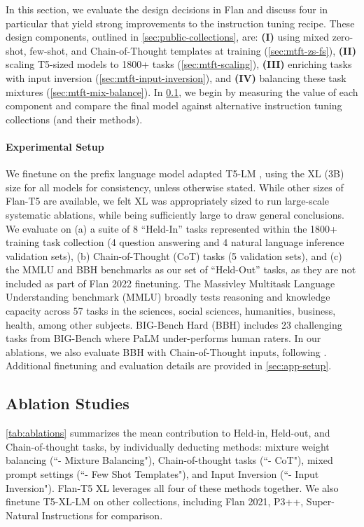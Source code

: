 In this section, we evaluate the design decisions in Flan and discuss four in particular that yield strong improvements to the instruction tuning recipe. These design components, outlined in \ref{sec:public-collections}, are: \textbf{(I)} using mixed zero-shot, few-shot, and Chain-of-Thought templates at training (\ref{sec:mtft-zs-fs}), \textbf{(II)} scaling T5-sized models to 1800+ tasks (\ref{sec:mtft-scaling}), \textbf{(III)} enriching tasks with input inversion (\ref{sec:mtft-input-inversion}), and \textbf{(IV)} balancing these task mixtures (\ref{sec:mtft-mix-balance}).
In \ref{sec:ablations}, we begin by measuring the value of each component and compare the final model against alternative instruction tuning collections (and their methods).

\paragraph{Experimental Setup} We finetune on the prefix language model adapted T5-LM \citep{lester-etal-2021-power}, using the XL (3B) size for all models for consistency, unless otherwise stated. While other sizes of Flan-T5 are available, we felt XL was appropriately sized to run large-scale systematic ablations, while being sufficiently large to draw general conclusions. We evaluate on (a) a suite of 8 ``Held-In'' tasks represented within the 1800+ training task collection (4 question answering and 4 natural language inference validation sets), (b) Chain-of-Thought (CoT) tasks (5 validation sets), and (c) the MMLU \citep{hendrycks2020measuring} and BBH \citep{suzgun2022challenging} benchmarks as our set of ``Held-Out'' tasks, as they are not included as part of Flan 2022 finetuning. The Massivley Multitask Language Understanding benchmark (MMLU) broadly tests reasoning and knowledge capacity across 57 tasks in the sciences, social sciences, humanities, business, health, among other subjects. BIG-Bench Hard (BBH) includes 23 challenging tasks from BIG-Bench \citep{bigbench} where PaLM under-performs human raters. In our ablations, we also evaluate BBH with Chain-of-Thought inputs, following \citet{chung2022scaling}.
Additional finetuning and evaluation details are provided in \ref{sec:app-setup}.

\subsection{Ablation Studies}
\label{sec:ablations}

\ref{tab:ablations} summarizes the mean contribution to Held-in, Held-out, and Chain-of-thought tasks, by individually deducting methods: mixture weight balancing (``- Mixture Balancing"), Chain-of-thought tasks (``- CoT"), mixed prompt settings (``- Few Shot Templates"), and Input Inversion (``- Input Inversion"). Flan-T5 XL leverages all four of these methods together. We also finetune T5-XL-LM on other collections, including Flan 2021, P3++, Super-Natural Instructions for comparison.

